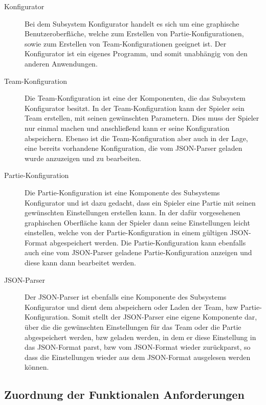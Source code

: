 		\begin{description}
			
			\item[Konfigurator]
			
			Bei dem Subsystem Konfigurator handelt es sich um eine graphische Benutzeroberfläche, welche zum Erstellen von Partie-Konfigurationen, sowie zum Erstellen von Team-Konfigurationen  geeignet ist. Der Konfigurator ist ein eigenes Programm, und somit unabhängig von den anderen Anwendungen.
			
			\item[Team-Konfiguration]
			Die Team-Konfiguration ist eine der Komponenten, die das Subsystem Konfigurator besitzt. In der Team-Konfiguration kann der Spieler sein Team erstellen, mit seinen gewünschten Parametern. Dies muss der Spieler nur einmal machen und anschließend kann er seine Konfiguration abspeichern. Ebenso ist die Team-Konfiguration aber auch in der Lage, eine bereits vorhandene Konfiguration, die vom JSON-Parser geladen wurde anzuzeigen und zu bearbeiten.
			
			\item[Partie-Konfiguration]
			Die Partie-Konfiguration ist eine Komponente des Subsystems Konfigurator und ist dazu gedacht, dass ein Spieler eine Partie mit seinen gewünschten Einstellungen erstellen kann. In der dafür vorgesehenen graphischen Oberfläche kann der Spieler dann seine Einstellungen leicht einstellen, welche von der Partie-Konfiguration in einem gültigen JSON-Format abgespeichert werden. Die Partie-Konfiguration kann ebenfalls auch eine vom JSON-Parser geladene Partie-Konfiguration anzeigen und diese kann dann bearbeitet werden.	
			
			\item[JSON-Parser]
			Der JSON-Parser ist ebenfalls eine Komponente des Subsystems Konfigurator und dient dem abspeichern oder Laden der Team, bzw Partie-Konfiguration. Somit stellt der JSON-Parser eine eigene Komponente dar, über die die gewünschten Einstellungen für das Team oder die Partie abgespeichert werden, bzw geladen werden, in dem er diese Einstellung in das JSON-Format parst, bzw vom JSON-Format wieder zurückparst, so dass die Einstellungen wieder aus dem JSON-Format ausgelesen werden können.

		\end{description}
		
	\subsection{Zuordnung der Funktionalen Anforderungen}
	
